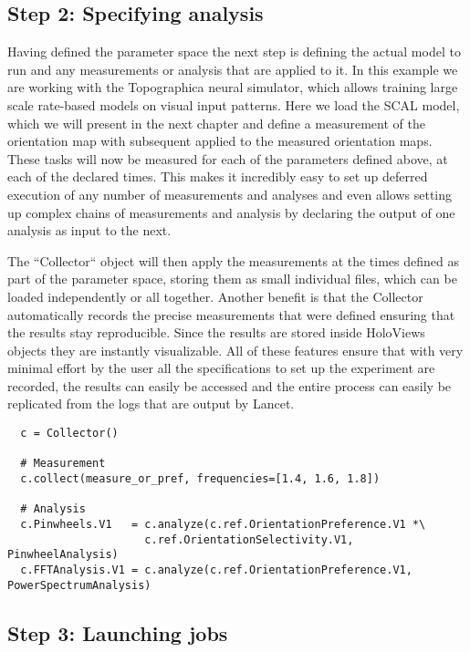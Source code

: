 \subsection{Step 2: Specifying analysis}

Having defined the parameter space the next step is defining the
actual model to run and any measurements or analysis that are applied
to it. In this example we are working with the Topographica neural
simulator, which allows training large scale rate-based models on
visual input patterns. Here we load the SCAL model, which we will
present in the next chapter and define a measurement of the
orientation map with subsequent applied to the measured orientation
maps. These tasks will now be measured for each of the parameters
defined above, at each of the declared times. This makes it incredibly
easy to set up deferred execution of any number of measurements and
analyses and even allows setting up complex chains of measurements and
analysis by declaring the output of one analysis as input to the next.

The ``Collector`` object will then apply the measurements at the times
defined as part of the parameter space, storing them as small
individual files, which can be loaded independently or all
together. Another benefit is that the Collector automatically records
the precise measurements that were defined ensuring that the results
stay reproducible. Since the results are stored inside HoloViews
objects they are instantly visualizable. All of these features ensure
that with very minimal effort by the user all the specifications to
set up the experiment are recorded, the results can easily be accessed
and the entire process can easily be replicated from the logs that are
output by Lancet.


\begin{minipage}{\linewidth}
\begin{lstlisting}
  c = Collector()

  # Measurement
  c.collect(measure_or_pref, frequencies=[1.4, 1.6, 1.8])

  # Analysis
  c.Pinwheels.V1   = c.analyze(c.ref.OrientationPreference.V1 *\
                     c.ref.OrientationSelectivity.V1, PinwheelAnalysis)
  c.FFTAnalysis.V1 = c.analyze(c.ref.OrientationPreference.V1, PowerSpectrumAnalysis)
\end{lstlisting}
\end{minipage}

\subsection{Step 3: Launching jobs}

